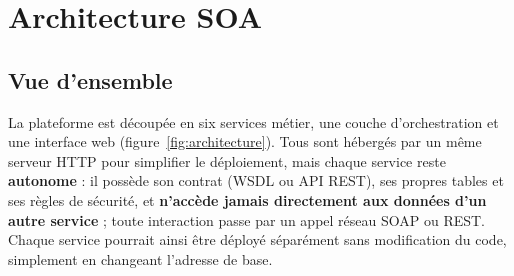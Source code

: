 \chapter{Architecture SOA}\label{chap:architecture}

\section{Vue d'ensemble}
La plateforme est découpée en six services métier, une couche d'orchestration et une interface web
(figure~\ref{fig:architecture}). Tous sont hébergés par un même serveur HTTP pour simplifier le déploiement, mais
chaque service reste \textbf{autonome} : il possède son contrat (WSDL ou API REST), ses propres tables et ses
règles de sécurité, et \textbf{n'accède jamais directement aux données d'un autre service} ; toute interaction
passe par un appel réseau SOAP ou REST. Chaque service pourrait ainsi être déployé séparément sans modification
du code, simplement en changeant l'adresse de base.

